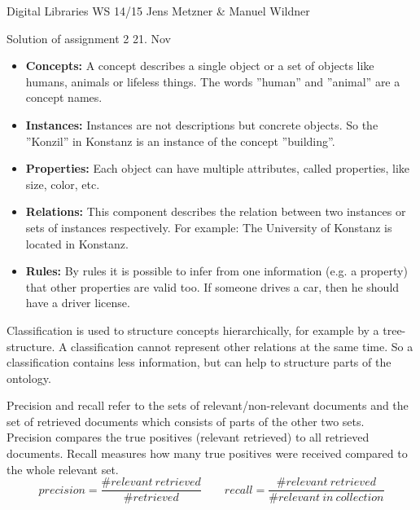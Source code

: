 \documentclass[10pt,a4paper]{scrartcl}
\begin{document}
\uebkopfzeile
  {Digital Libraries} %
  {WS 14/15}  %
  {}    %
  {Jens Metzner \& Manuel Wildner}    %

\uebtitel
{Solution of assignment 2} %
{21. Nov} %


\begin{itemize}
	\item \textbf{Concepts:} A concept describes a single object or a set of objects like humans, animals or lifeless things. The words ''human'' and ''animal'' are a concept names.
	\item \textbf{Instances:} Instances are not descriptions but concrete objects. So the ''Konzil'' in Konstanz is an instance of the concept ''building''.
	\item \textbf{Properties:} Each object can have multiple attributes, called properties, like size, color, etc.
	\item \textbf{Relations:} This component describes the relation between two instances or sets of instances respectively. For example: The University of Konstanz is located in Konstanz.
	\item \textbf{Rules:} By rules it is possible to infer from one information (e.g. a property) that other properties are valid too. If someone drives a car, then he should have a driver license.
\end{itemize}
Classification is used to structure concepts hierarchically, for example by a tree-structure. A classification cannot represent other relations at the same time. So a classification contains less information, but can help to structure parts of the ontology.


Precision and recall refer to the sets of relevant/non-relevant documents and the set of retrieved documents which consists of parts of the other two sets.\\
Precision compares the true positives (relevant retrieved) to all retrieved documents. Recall measures how many true positives were received compared to the whole relevant set.\\
\[
	precision = \frac{\# relevant\ retrieved}{\# retrieved} \qquad recall = \frac{\# relevant\ retrieved}{\# relevant\ in\ collection}
\]
\end{document}
